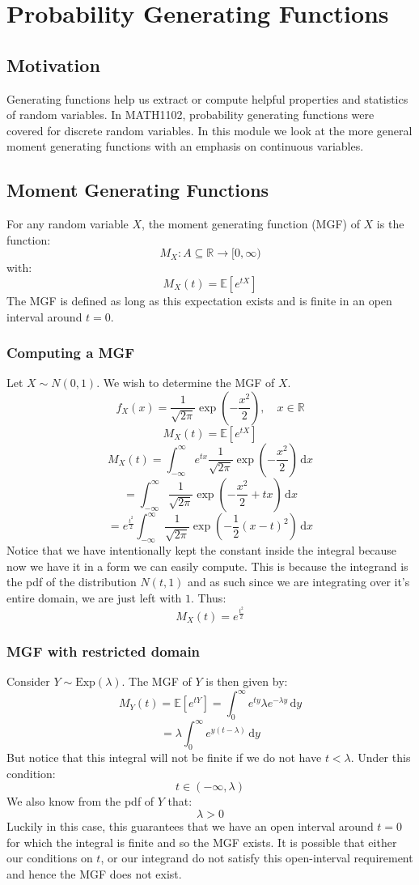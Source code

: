 \documentclass[12pt]{article}
\begin{document}
\section{Probability Generating Functions}
\subsection{Motivation}
Generating functions help us extract or compute helpful properties and statistics of random variables. In MATH1102, probability generating functions were covered for discrete random variables. In this module we look at the more general moment generating functions with an emphasis on continuous variables.
\subsection{Moment Generating Functions}
For any random variable \(X\), the moment generating function (MGF) of \(X\) is the function:
\[M_X:A\subseteq \mathbb{R}\to[0,\infty)\]
with:
\[M_X(t)=\mathbb{E}\left[e^{tX}\right]\]
The MGF is defined as long as this expectation exists and is finite in an open interval around \(t=0\).
\subsubsection{Computing a MGF}
Let \(X\sim N(0,1)\). We wish to determine the MGF of \(X\).
\[f_X(x)=\frac{1}{\sqrt{2\pi}}\exp\left(-\frac{x^2}{2}\right),\quad x\in\mathbb{R}\]
\[M_X(t)=\mathbb{E}\left[e^{tX}\right]\]
\[M_X(t)=\int^\infty_{-\infty}e^{tx}\frac{1}{\sqrt{2\pi}}\exp\left(-\frac{x^2}{2}\right)\,\text{d}x\]
\[=\int^\infty_{-\infty}\frac{1}{\sqrt{2\pi}}\exp\left(-\frac{x^2}{2}+tx\right)\,\text{d}x\]
\[=e^{\frac{t^2}{2}}\int^\infty_{-\infty}\frac{1}{\sqrt{2\pi}}\exp\left(-\frac{1}{2}(x-t)^2\right)\,\text{d}x\]
Notice that we have intentionally kept the constant inside the integral because now we have it in a form we can easily compute. This is because the integrand is the pdf of the distribution \(N(t,1)\) and as such since we are integrating over it's entire domain, we are just left with \(1\). Thus:
\[M_X(t)=e^{\frac{t^2}{2}}\]
\subsubsection{MGF with restricted domain}
Consider \(Y\sim\text{Exp}(\lambda)\). The MGF of \(Y\) is then given by:
\[M_Y(t)=\mathbb{E}[e^{tY}]=\int^\infty_0e^{ty}\lambda e^{-\lambda y}\,\text{d}y\]
\[=\lambda\int^\infty_0e^{y(t-\lambda)}\,\text{d}y\]
But notice that this integral will not be finite if we do not have \(t<\lambda\). Under this condition:
\[t\in(-\infty, \lambda)\]
We also know from the pdf of \(Y\) that:
\[\lambda > 0\]
Luckily in this case, this guarantees that we have an open interval around \(t=0\) for which the integral is finite and so the MGF exists. It is possible that either our conditions on \(t\), or our integrand do not satisfy this open-interval requirement and hence the MGF does not exist.
\end{document}
